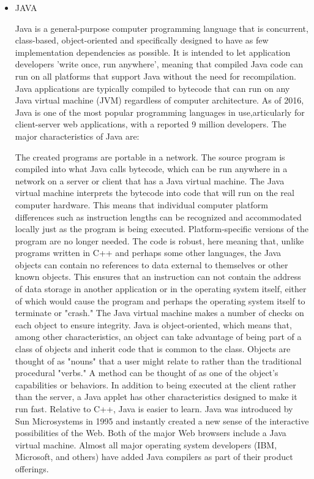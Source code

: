 \documentclass[12pt,a4paper,titlepage]{article}
\begin{document}
\begin{itemize}

\item JAVA

	Java is a general-purpose computer programming language that is concurrent, class-based, object-oriented and specifically designed to have as few implementation dependencies as possible. It is intended to let application developers 'write once, run anywhere', meaning that compiled Java code can run on all platforms that support Java without the need for recompilation. Java applications are typically compiled to bytecode that can run on any Java virtual machine (JVM) regardless of computer architecture. As of 2016, Java is one of the most popular programming languages in use,articularly for client-server web applications, with a reported 9 million developers.
	 The major characteristics of Java are:

    The created programs are portable in a network. The source program is compiled into what Java calls bytecode, which can be run anywhere in a network on a server or client that has a Java virtual machine. The Java virtual machine interprets the bytecode into code that will run on the real computer hardware. This means that individual computer platform differences such as instruction lengths can be recognized and accommodated locally just as the program is being executed. Platform-specific versions of the program are no longer needed.
    The code is robust, here meaning that, unlike programs written in C++ and perhaps some other languages, the Java objects can contain no references to data external to themselves or other known objects. This ensures that an instruction can not contain the address of data storage in another application or in the operating system itself, either of which would cause the program and perhaps the operating system itself to terminate or "crash." The Java virtual machine makes a number of checks on each object to ensure integrity.
    Java is object-oriented, which means that, among other characteristics, an object can take advantage of being part of a class of objects and inherit code that is common to the class. Objects are thought of as "nouns" that a user might relate to rather than the traditional procedural "verbs." A method can be thought of as one of the object's capabilities or behaviors.
    In addition to being executed at the client rather than the server, a Java applet has other characteristics designed to make it run fast.
    Relative to C++, Java is easier to learn.
    Java was introduced by Sun Microsystems in 1995 and instantly created a new sense of the interactive possibilities of the Web. Both of the major Web browsers include a Java virtual machine. Almost all major operating system developers (IBM, Microsoft, and others) have added Java compilers as part of their product offerings.


\end{itemize}
\end{document}
